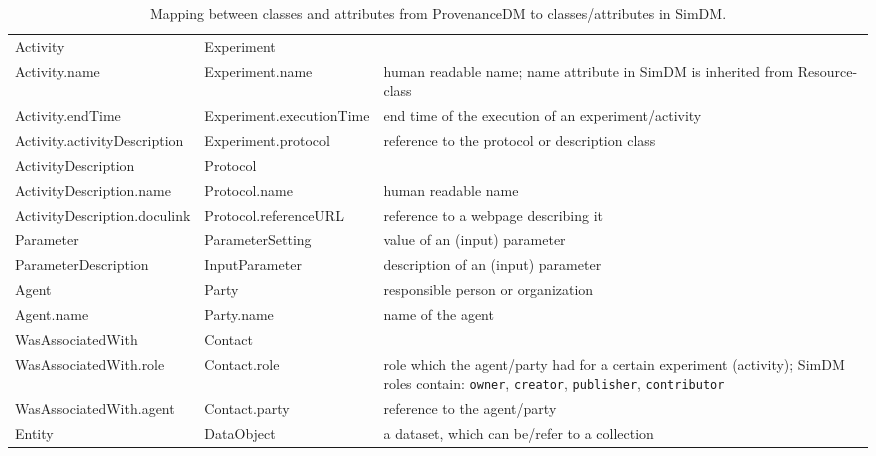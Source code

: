 \begin{table}[h]
\small
{}\textwidth
\begin{tabulary}{1.0\textwidth}{@{}Llp{4cm}@{}}
\toprule
{} &  & \\
\midrule
Activity               & Experiment      &  \\
Activity.name         & Experiment.name & human readable name; name attribute in SimDM is inherited from Resource-class\\
Activity.endTime & Experiment.executionTime  & end time of the execution of an experiment/activity \\
Activity.activityDescription & Experiment.protocol & reference to the protocol or description class \\
ActivityDescription    & Protocol        & \\
ActivityDescription.name  & Protocol.name   & human readable name\\
ActivityDescription.doculink & Protocol.referenceURL & reference to a webpage describing it\\
Parameter              & ParameterSetting     & value of an (input) parameter\\
ParameterDescription   & InputParameter       & description of an (input) parameter\\
Agent           & Party           & responsible person or organization\\
Agent.name      & Party.name      & name of the agent \\
WasAssociatedWith & Contact         & \\
WasAssociatedWith.role & Contact.role    & role which the agent/party had for a certain experiment (activity); SimDM roles contain: \texttt{owner}, \texttt{creator}, \texttt{publisher}, \texttt{contributor}\\
WasAssociatedWith.agent & Contact.party    & reference to the agent/party \\
Entity        & DataObject     & a dataset, which can be/refer to a collection\\

\bottomrule
\end{tabulary}
\caption{Mapping between classes and attributes from ProvenanceDM to classes/attributes in SimDM.}
\label{tab:simdmmapping}
\end{table}




